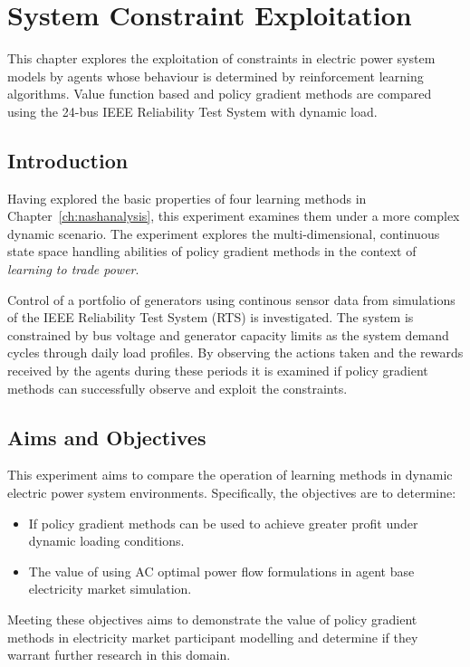 \chapter{System Constraint Exploitation}
\label{ch:exploitation}
This chapter explores the exploitation of constraints in electric power
system models by agents whose behaviour is determined by reinforcement learning
algorithms.  Value function based and policy gradient methods are compared
using the 24-bus IEEE Reliability Test System with dynamic load.

\section{Introduction}
Having explored the basic properties of four learning methods in
Chapter~\ref{ch:nashanalysis}, this experiment examines them under a
more complex dynamic scenario.  The experiment explores the multi-dimensional,
continuous state space handling abilities of policy gradient methods in the
context of \textit{learning to trade power}.

Control of a portfolio of generators using continous sensor data from
simulations of the IEEE Reliability Test System (RTS) \cite{ieee79rts} is
investigated.  The system is constrained by bus voltage and generator capacity
limits as the system demand cycles through daily load profiles. By
observing the actions taken and the rewards received by the agents during these
periods it is examined if policy gradient methods can successfully observe and
exploit the constraints.

\section{Aims and Objectives}
This experiment aims to compare the operation of learning methods in dynamic
electric power system environments.  Specifically, the objectives are to
determine:
\begin{itemize}
  \item If policy gradient methods can be used to achieve greater profit under
  dynamic loading conditions.
  \item The value of using AC optimal power flow formulations in agent base
  electricity market simulation.
\end{itemize}
Meeting these objectives aims to demonstrate the value of policy gradient
methods in electricity market participant modelling and determine if they
warrant further research in this domain.

